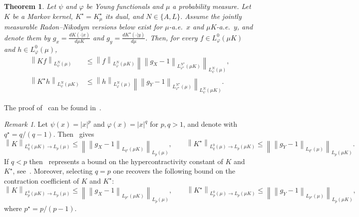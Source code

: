 \documentclass[11pt]{article}
\theoremstyle{plain}
\newtheorem{theorem}{Theorem}[section]
\theoremstyle{remark}
\newtheorem{remark}{Remark}
\begin{document}
\begin{theorem}\label{thm:psiNormsContraction}
        Let $\psi$ and $\varphi$ be Young functionals and $\mu$ %
        a probability measure. Let $K$ be a Markov kernel, %
        $K^\star=K^\star_\mu$ its dual, and $N\in \{A,L\}$. Assume the jointly measurable Radon--Nikodym versions below exist for $\mu$-a.e.\ $x$ and $\mu K$-a.e.\ $y$, and denote them by $g_x = \frac{dK(\cdot|x)}{d\mu K}$ and $g_y =\frac{dK^\star(\cdot|y)}{d\mu}$. Then, for every $f\in L_\varphi^{0}(\mu K)$ and $h \in L_\varphi^0(\mu)$,
    \begin{align}
       \left\lVert Kf \right\rVert_{L_\psi^N(\mu)}
       &\leq
       \left\lVert f \right\rVert_{L_\varphi^N(\mu K)}
       \left\lVert
       \left\lVert g_X-1\right\rVert_{L_{\varphi^\star}^{N^\star}(\mu K)}
       \right\rVert_{L_\psi^N(\mu )},
       \label{eq:forwardMixedOrlicz}\\
       \left\lVert K^\star h \right\rVert_{L_\psi^N(\mu K)}
       &\leq
       \left\lVert h \right\rVert_{L_\varphi^N(\mu )}
       \left\lVert
       \left\lVert g_Y-1\right\rVert_{L_{\varphi^\star}^{N^\star}(\mu )}
       \right\rVert_{L_\psi^N(\mu K)}.
       \label{eq:reverseMixedOrlicz}
    \end{align}
    \end{theorem}
      The proof of~ can be found in~.
\begin{remark}
           Let $\psi(x)=|x|^p$ and $\varphi(x)=|x|^q$ for $p,q>1$, and denote with $q^\star= q/(q-1)$. Then~ gives
    \begin{equation}
          \left\lVert K\right\rVert_{L_q^0(\mu K)\to L_p(\mu)}
          \leq \left\lVert \left\lVert g_X -1  \right\rVert_{L_{q^\star}(\mu K)} \right\rVert_{L_p(\mu )},
          \qquad
          \left\lVert K^\star\right\rVert_{L_q^0(\mu)\to L_p(\mu K)}
          \leq\left\lVert \left\lVert g_Y-1\right\rVert_{L_{q^\star}(\mu )}\right\rVert_{L_p(\mu K)}.
          \label{thm:alphaNormsHyperContraction}
    \end{equation}
    If $q<p$ then~ represents a bound on the hypercontractivity constant of $K$ and $K^\star$, see~\cite[Section 2]{logSobMarkovChains}. 
    Moreover, selecting $q=p$ one recovers the following bound on the contraction coefficient of $K$ and $K^\star$:
      \begin{equation}
          \left\lVert K\right\rVert_{L_p^0(\mu K)\to L_p(\mu)}
          \leq \left\lVert \left\lVert g_X -1  \right\rVert_{L_{p^\star}(\mu K)} \right\rVert_{L_p(\mu )},
          \qquad
          \left\lVert K^\star\right\rVert_{L_p^0(\mu)\to L_p(\mu K)}
          \leq\left\lVert \left\lVert g_Y-1\right\rVert_{L_{p^\star}(\mu )}\right\rVert_{L_p(\mu K)},
          \label{thm:alphaNormsContraction}
    \end{equation}
    where $p^\star = p/(p-1)$.
        \end{remark}
        
\end{document}
